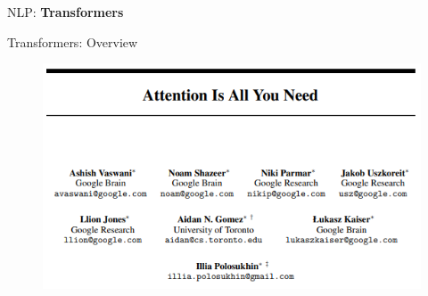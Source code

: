 \begin{frame}{}
    \LARGE NLP: \textbf{Transformers}
\end{frame}

\begin{frame}[allowframebreaks]{Transformers: Overview}
    \begin{figure}
        \centering
        \includegraphics[width=\linewidth, height=0.9\textheight,keepaspectratio]{images/nlp/transformers-paper.png}
    \end{figure}
    \framebreak


\end{frame}
